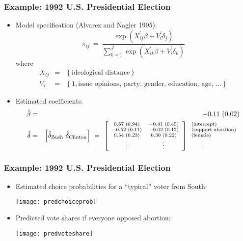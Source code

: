 \documentclass{beamer}
\begin{document}
\begin{frame}
\frametitle{Example: 1992 U.S. Presidential Election}
\begin{itemize}
\item Model specification (Alvarez and Nagler 1995):
$$ \pi_{ij} \ = \ \frac{\exp(X_{ij}^{'} \beta + V_i^{'} \delta_j)}
 {\sum_{k=1}^J\exp(X_{ik}^{'} \beta + V_i^{'} \delta_k)} $$
where
\begin{eqnarray*}
 X_{ij} & = & \left\{\text{ideological distance}\right\} \\
 V_{i} & = & \left\{1, \text{issue opinions, party, gender, education, age, ...} \right\}
\end{eqnarray*}
\pause
\item Estimated coefficients:
\begin{eqnarray*}
\hat\beta & = & -0.11 \ (0.02) \\
\hat\delta & = & \left[\hat\delta_\text{Bush} \ \hat\delta_\text{Clinton}\right]
 \ = \ \left[ {\scriptsize
            \begin{array}{cc} 0.67 \ (0.94) & -0.41 \ (0.45) \\
                              -0.52 \ (0.11) & -0.02 \ (0.12)  \\
                              0.54 \ (0.23) & 0.30 \ (0.22) \\
                               \vdots & \vdots \end{array} } \right]
           {\scriptsize
            \begin{array}{l} \text{(intercept)} \\
                             \text{(support abortion)} \\
                             \text{(female)} \\
                             \qquad \vdots \end{array} }
\end{eqnarray*}
\end{itemize}
\end{frame}

\begin{frame}
\frametitle{Example: 1992 U.S. Presidential Election}
\begin{itemize}
\item Estimated choice probabilities for a ``typical'' voter from South:
\vspace{-1.5\baselineskip}
\begin{center}
\texttt{[image: predchoiceprob]}
\end{center}
\vspace{-1.5\baselineskip}
\pause
\item Predicted vote shares if everyone opposed abortion:
\vspace{-1.5\baselineskip}
\begin{center}
\texttt{[image: predvoteshare]}
\end{center}
\vspace{-1.5\baselineskip}
\end{itemize}
\end{frame}
\end{document}
